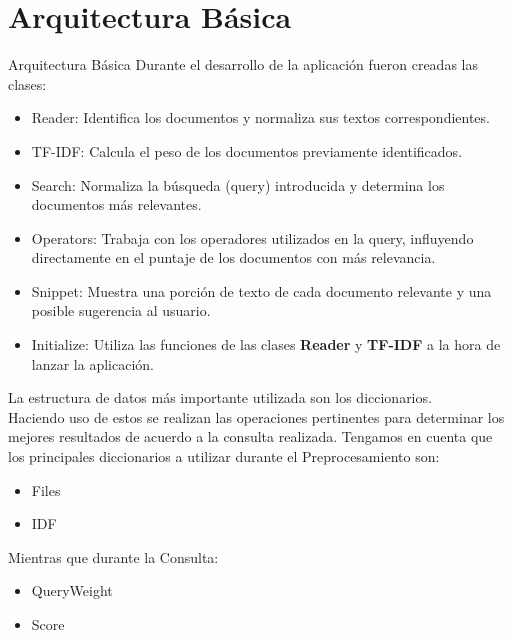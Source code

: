 \section{Arquitectura Básica}
\begin{frame}{Arquitectura Básica}
	Durante el desarrollo de la aplicación fueron creadas las clases:
	\begin{itemize}
		\item Reader: Identifica los documentos y normaliza sus textos correspondientes.
		\item TF-IDF: Calcula el peso de los documentos previamente identificados.
		\item Search: Normaliza la búsqueda (query) introducida y determina los documentos más relevantes.
		\item Operators: Trabaja con los operadores utilizados en la query, influyendo directamente
		      en el puntaje de los documentos con más relevancia.
		\item Snippet: Muestra una porción de texto de cada documento relevante y una posible
		      sugerencia al usuario.
		\item Initialize: Utiliza las funciones de las clases \textbf{Reader} y \textbf{TF-IDF}
		      a la hora de lanzar la aplicación.
	\end{itemize}
\end{frame}
\begin{frame}{}
La estructura de datos más importante utilizada son los diccionarios.\\
Haciendo uso de estos se realizan las operaciones pertinentes para determinar los mejores
resultados de acuerdo a la consulta realizada.
\newline
\newline
Tengamos en cuenta que los principales diccionarios a utilizar durante el Preprocesamiento son:
\begin{itemize}
	\item Files
	\item IDF
\end{itemize}
Mientras que durante la Consulta:
\begin{itemize}
	\item QueryWeight
	\item Score
\end{itemize}
\end{frame}

